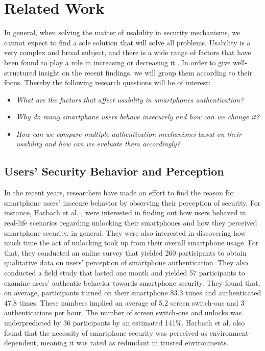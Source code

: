 \section{Related Work} \label{2.2}

In general, when solving the matter of usability in security mechanisms, we cannot expect to find a sole solution that will solve all problems. Usability is a very complex and broad subject, and there is a wide range of factors that have been found to play a role in increasing or decreasing it \cite{Zezschwitz,harbach,Albayram:2017:BUL:3235924.3235929, AnatomySmartphone}. In order to give well-structured insight on the recent findings, we will group them according to their focus. Thereby the following research questions will be of interest: 

\begin{itemize}
    \item \textit{What are the factors that affect usability in smartphones authentication?}
\item \textit{Why do many smartphone users behave insecurely and how can we change it?} 
    \item \textit{How can we compare multiple authentication mechanisms based on their usability and how can we evaluate them accordingly?}
\end{itemize}

\subsection{Users' Security Behavior and Perception} \label{2.2.1}

In the recent years, researchers have made an effort to find the reason for smartphone users' insecure behavior by observing their perception of security. For instance, Harbach et al. \cite{harbach}, were interested in finding out how users behaved in real-life scenarios regarding unlocking their smartphones and how they perceived smartphone security, in general. They were also interested in discovering how much time the act of unlocking took up from their overall smartphone usage. For that, they conducted an online survey that yielded 260 participants to obtain qualitative data on users' perception of smartphone authentication. They also conducted a field study that lasted one month and yielded 57 participants to examine users' authentic behavior towards smartphone security. They found that, on average, participants turned on their smartphone 83.3 times and authenticated 47.8 times. These numbers implied an average of 5.2 screen switch-ons and 3 authentications per hour. The number of screen switch-ons and unlocks was underpredicted by 36 participants by an estimated 141\%. Harbach et al. \cite{harbach} also found that the necessity of smartphone security was perceived as environment-dependent, meaning it was rated as redundant in trusted environments.\\

